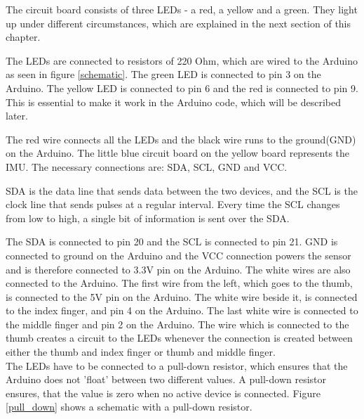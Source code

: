 The circuit board consists of three LEDs - a red, a yellow and a green. They light up under different circumstances, which are explained in the next section of this chapter.

The LEDs are connected to resistors of 220 Ohm, which are wired to the Arduino as seen in figure \ref{schematic}. The green LED is connected to pin 3 on the Arduino. The yellow LED is connected to pin 6 and the red is connected to pin 9. This is essential to make it work in the Arduino code, which will be described later. 

The red wire connects all the LEDs and the black wire runs to the ground(GND) on the Arduino. The little blue circuit board on the yellow board represents the IMU. The necessary connections are: SDA, SCL, GND and VCC. 

SDA is the data line that sends data between the two devices, and the SCL is the clock line that sends pulses at a regular interval\citep{Arduino_SDA}. Every time the SCL changes from low to high, a single bit of information is sent over the SDA.

The SDA is connected to pin 20 and the SCL is connected to pin 21. GND is connected to ground on the Arduino and the VCC connection powers the sensor and is therefore connected to 3.3V pin on the Arduino. The white wires are also connected to the Arduino. The first wire from the left, which goes to the thumb, is connected to the 5V pin on the Arduino. The white wire beside it, is connected to the index finger, and pin 4 on the Arduino. The last white wire is connected to the middle finger and pin 2 on the Arduino. The wire which is connected to the thumb creates a circuit to the LEDs whenever the connection is created between either the thumb and index finger or thumb and middle finger. \\

The LEDs have to be connected to a pull-down resistor\citep{Pulldown_res}, which ensures that the Arduino does not 'float' between two different values. A pull-down resistor ensures, that the value is zero when no active device is connected.
Figure \ref{pull_down} shows a schematic with a pull-down resistor. \\


\begin{minipage}{\linewidth}%
\label{pull_down}
\end{minipage}\\

